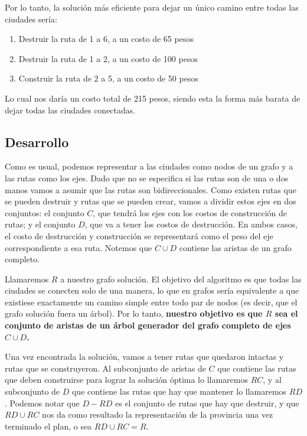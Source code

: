 \bigskip

Por lo tanto, la solución más eficiente para dejar un único camino entre todas las ciudades sería:

\begin{enumerate}
	\item Destruir la ruta de 1 a 6, a un costo de 65 pesos

	\item Destruir la ruta de 1 a 2, a un costo de 100 pesos

	\item Construir la ruta de 2 a 5, a un costo de 50 pesos
\end{enumerate}

Lo cual nos daría un costo total de 215 pesos, siendo esta la forma más barata de dejar todas las ciudades conectadas.

\subsection{Desarrollo}
Como es usual, podemos representar a las ciudades como nodos de un grafo y a las rutas como los ejes. Dado que no se especifica si las rutas son de una o dos manos vamos a asumir que las rutas son bidireccionales. Como existen rutas que se pueden destruir y rutas que se pueden crear, vamos a dividir estos ejes en dos conjuntos: el conjunto $C$, que tendrá los ejes con los costos de construcción de rutas; y el conjunto $D$, que va a tener los costos de destrucción. En ambos casos, el costo de destrucción y construcción se representará como el peso del eje correspondiente a esa ruta. Notemos que $C \cup D$ contiene las aristas de un grafo completo. %

Llamaremos $R$ a nuestro grafo solución. El objetivo del algoritmo es que todas las ciudades se conecten solo de una manera, lo que en grafos sería equivalente a que existiese exactamente un camino simple entre todo par de
nodos (es decir, que el grafo solución fuera un árbol). Por lo tanto, \textbf{nuestro objetivo es que $R$ sea el conjunto de aristas de un árbol generador del grafo completo de ejes $C \cup D$.} %

Una vez encontrada la solución, vamos a tener rutas que quedaron intactas y rutas que se construyeron. Al subconjunto de aristas de $C$ que contiene las rutas que deben construirse para lograr la solución óptima lo llamaremos $RC$, y al subconjunto de $D$ que contiene las rutas que hay que mantener lo llamaremos $RD$. Podemos notar que $D - RD$ es el conjunto de rutas que hay que destruir, y que $RD \cup RC$ nos da como resultado la representación de la provincia una vez terminado el plan, o sea $RD \cup RC = R$.


